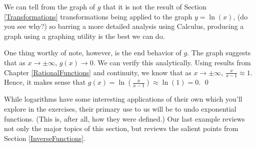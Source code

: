 \begin{ex}
\begin{enumerate}
\begin{center}
\begin{multicols}{2}
\end{multicols}

\end{center}

  We can tell from the graph of $g$ that it is not the result of Section \ref{Transformations} transformations being applied to the graph $y = \ln(x)$, (do you see why?)  so barring a more detailed analysis using Calculus, producing a graph using a graphing utility is the best we can do.  
  
  \smallskip

One thing worthy of note, however, is the end behavior of $g$.  The graph suggests that as $x \rightarrow \pm \infty$, $g(x) \rightarrow 0$.  We can verify this analytically.  Using results  from Chapter \ref{RationalFunctions} and continuity, we know that as $x \rightarrow \pm \infty$, $\frac{x}{x-1} \approx 1$.  Hence, it makes sense that $g(x) = \ln \left(\frac{x}{x-1}\right) \approx \ln(1) = 0$.  \qed

\end{enumerate}

\end{ex}

While logarithms have some interesting applications of their own which you'll explore in the exercises, their primary use to us will be to undo exponential functions. (This is, after all, how they were defined.)  Our last example  reviews not only the major topics of this section, but reviews the salient points from Section \ref{InverseFunctions}.

\newpage

